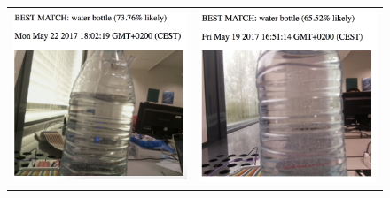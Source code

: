 \begin{figure}[H]
	\centering
	\begin{tabular}{cc}
		\includegraphics[scale=0.5]{images/water-bottle-1.png}
		&
		\includegraphics[scale=0.5]{images/water-bottle-2.png}

\end{tabular}
\end{figure}
